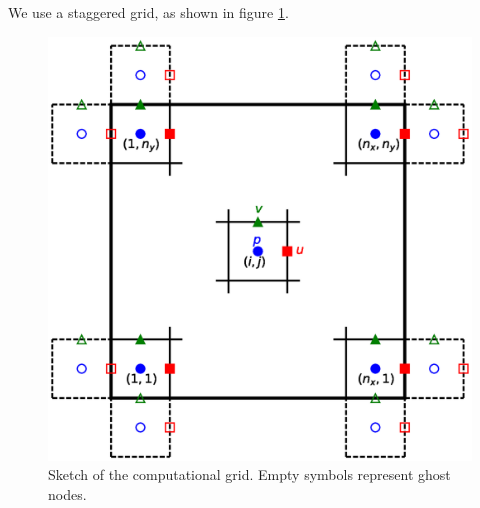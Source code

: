 \documentclass[a4paper,11pt]{report}
\begin{document}
We use a staggered grid, as shown in figure \ref{fig:grid}.

\begin{figure}[ht]
    \includegraphics[width=\textwidth]{grid.eps}
    \caption{Sketch of the computational grid. Empty symbols represent ghost nodes.\label{fig:grid}}
\end{figure}
\end{document}
